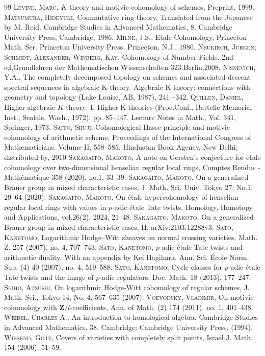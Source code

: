 \documentclass{article}
\begin{document}
\begin{thebibliography}{99}
\textsc{Levine, Marc},
$K$-theory and motivic cohomology of schemes, Preprint, 1999.
\textsc{Matsumura, Hideyuki},
Commutative ring theory, 
Translated from the Japanese by M. Reid. 
Cambridge Studies in Advanced Mathematics, 8. 
Cambridge University Press, Cambridge, 1986.
\textsc{Milne, J.S.},
Etale Cohomology,
Princeton Math. Ser. 
Princeton University Press, Princeton, N.J., 1980.
\textsc{Neukirch, J\"{u}rgen; Schmidt, Alexander; Winberg, Kay},
Cohomology of Number Fields. 
2nd ed,Grundlehren der Mathematischen Wissenschaften 323.Berlin,2008.
\textsc{Nisnevich, Y.A.},
The completely decomposed topology on schemes and associated descent spectral sequences in algebraic K-theory.
Algebraic K-theory: connections with geometry and topology (Lake Louise, AB, 1987), 241–-342.
\textsc{Quillen, Daniel},
Higher algebraic $K$-theory: I.
Higher K-theories (Proc.Conf., 
Battelle Memorial Inst., Seattle, Wash., 1972), pp. 85--147. 
Lecture Notes in Math.,
Vol. 341, Springer, 1973.
\textsc{Saito, Shuji},
Cohomological Hasse principle and motivic cohomology
of arithmetic scheme, Proceedings of the International Congress
of Mathematicians. Volume II, 558--585.
Hindustan Book Agency, New Delhi; distributed by, 2010
\textsc{Sakagaito, Makoto},
A note on Gersten’s conjecture for \'{e}tale
cohomology over two-dimensional henselian
regular local rings,
Comptes Rendus - Math\'{e}matique 358 (2020), no.1, 33--39.
\textsc{Sakagaito, Makoto},
On a generalized Brauer group in mixed characteristic cases,
J. Math. Sci. Univ. Tokyo 27, 
No.1, 29--64 (2020). 
\textsc{Sakagaito, Makoto},
On \'{e}tale hypercohomology of henselian regular local rings with values
in $p$-adic \'{e}tale Tate twists,
Homology, Homotopy and Applications, vol.26(2), 2024, 21--48.
\textsc{Sakagaito, Makoto},
On a generalized Brauer group in mixed characteristic cases, II,
arXiv:2103.12288v3.
\textsc{Sato, Kanetomo},
Logarithmic Hodge--Witt sheaves on normal crossing
varieties,
Math. Z. 257 (2007), no. 4, 707--743.
\textsc{Sato, Kanetomo},
$p$-adic \'{e}tale Tate twists and arithmetic duality.  
With an appendix by Kei Hagihara. 
Ann. Sci. \'{E}cole Norm. Sup. (4) 40 (2007), 
no. 4, 519--588. 
\textsc{Sato, Kanetomo},
Cycle classes for $p$-adic \'{e}tale 
Tate twists and the image 
of $p$-adic regulators.
Doc. Math. 18 (2013),
177--247.
\textsc{Shiho, Atsushi},
On logarithmic Hodge-Witt cohomology of regular schemes,
J. Math. Sci., Tokyo 14, No. 4, 567--635 (2007).
\textsc{Voevodsky, Vladimir},
On motivic cohomology with $\mathbf{Z}/l$-coefficients,
Ann. of Math. (2) 174 (2011), no. 1, 401--438.
\textsc{Weibel, Charles A.},
An introduction to homological algebra.
Cambridge Studies in Advanced Mathematics. 38. Cambridge: Cambridge University Press. (1994).
\textsc{Wiesend, G\"{o}tz},
Covers of varieties with completely split points,
Israel J. Math. 154 (2006), 51--59.
\end{thebibliography}
%
%
\end{document}
